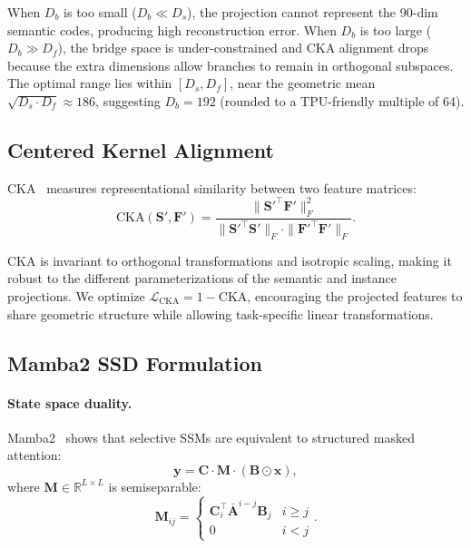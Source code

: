 \documentclass[10pt,twocolumn,letterpaper]{article}
\begin{document}
When $D_b$ is too small ($D_b \ll D_s$), the projection cannot represent the 90-dim semantic codes, producing high reconstruction error. When $D_b$ is too large ($D_b \gg D_f$), the bridge space is under-constrained and CKA alignment drops because the extra dimensions allow branches to remain in orthogonal subspaces. The optimal range lies within $[D_s, D_f]$, near the geometric mean $\sqrt{D_s \cdot D_f} \approx 186$, suggesting $D_b = 192$ (rounded to a TPU-friendly multiple of 64).


\subsection{Centered Kernel Alignment}
\label{sec:supp_cka}

CKA~\cite{kornblith2019cka} measures representational similarity between two feature matrices:
\begin{equation}
\text{CKA}(\mathbf{S}', \mathbf{F}') = \frac{\|\mathbf{S}'^{\!\top} \mathbf{F}'\|_F^2}{\|\mathbf{S}'^{\!\top} \mathbf{S}'\|_F \cdot \|\mathbf{F}'^{\!\top} \mathbf{F}'\|_F}.
\end{equation}

CKA is invariant to orthogonal transformations and isotropic scaling, making it robust to the different parameterizations of the semantic and instance projections. We optimize $\mathcal{L}_{\text{CKA}} = 1 - \text{CKA}$, encouraging the projected features to share geometric structure while allowing task-specific linear transformations.


\subsection{Mamba2 SSD Formulation}
\label{sec:supp_mamba2}

\paragraph{State space duality.}
Mamba2~\cite{dao2024mamba2} shows that selective SSMs are equivalent to structured masked attention:
\begin{equation}
\mathbf{y} = \mathbf{C} \cdot \mathbf{M} \cdot (\mathbf{B} \odot \mathbf{x}),
\end{equation}
where $\mathbf{M} \in \mathbb{R}^{L \times L}$ is semiseparable:
\begin{equation}
\mathbf{M}_{ij} = \begin{cases} \mathbf{C}_i^\top \bar{\mathbf{A}}^{i-j} \mathbf{B}_j & i \geq j \\ 0 & i < j \end{cases}.
\end{equation}
\end{document}
